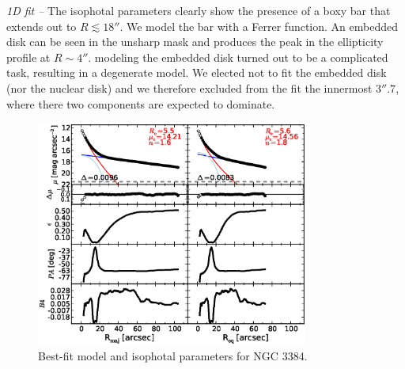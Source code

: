\documentclass[preprint2]{emulateapj}
\newcommand{\fitfigurewidth}{0.8\textwidth}
\begin{document}
  \emph{1D fit -- }
  The isophotal parameters clearly show the presence of a boxy bar that extends out to $R \lesssim 18''$.
  We model the bar with a Ferrer function.
  An embedded disk can be seen in the unsharp mask and produces the peak in the ellipticity profile at $R \sim 4''$.
  modeling the embedded disk turned out to be a complicated task, resulting in a degenerate model.
  We elected not to fit the embedded disk (nor the nuclear disk) and we therefore excluded from the fit the innermost $3''.7$,
  where there two components are expected to dominate.

  \begin{figure}[h]
  \begin{center}
  \includegraphics[width=\fitfigurewidth]{images/n3384_1Dfit.eps}
  \caption{Best-fit model and isophotal parameters for NGC 3384.}
  \end{center}
  \end{figure}
\end{document}
